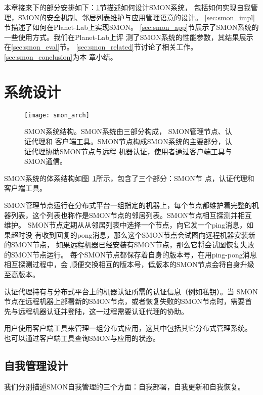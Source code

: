 本章接来下的部分安排如下：\ref{sec:smon_design}节描述如何设计SMON系统，
包括如何实现自我管理，SMON的安全机制、邻居列表维护与应用管理语意的设计。
\ref{sec:smon_impl}节描述了如何在Planet-Lab上实现SMON。
\ref{sec:smon_app}节展示了SMON系统的一些使用方式。我们在Planet-Lab上评
测了SMON系统的性能参数，其结果展示在\ref{sec:smon_eval}节。
\ref{sec:smon_related}节讨论了相关工作。\ref{sec:smon_conclusion}为本
章小结。


\section{系统设计}
\label{sec:smon_design}

\begin{figure}
  \centering
  \begin{minipage}{0.8\linewidth}
    \centering
    \texttt{[image: smon\_arch]}
    \caption[SMON系统结构]{SMON系统结构。SMON系统由三部分构成，
    SMON管理节点、认证代理和
    客户端工具。SMON节点构成SMON系统的主要部分，认证代理协助SMON节点与远程
    机器认证，使用者通过客户端工具与SMON通信。}
    \label{fig:smon_arch}
  \end{minipage}
\end{figure}

SMON系统的体系结构如图~\ref{fig:smon_arch}所示，包含了三个部分：SMON节
点，认证代理和客户端工具。

SMON管理节点运行在分布式平台一组指定的机器上，每个节点都维护着完整的机
器列表，这个列表也称作是SMON节点的邻居列表。SMON节点相互探测并相互维护。
SMON节点定期从从邻居列表中选择一个节点，向它发一个ping消息，如果超时没
有收到回复的pong消息，那么这个SMON节点会试图向远程机器安装新的SMON节点，
如果远程机器已经安装有SMON节点，那么它将会试图恢复失败的SMON节点运行。
每个SMON节点都保存着自身的版本号，在用ping-pong消息相互探测过程中，会
顺便交换相互的版本号，低版本的SMON节点会将自身升级至高版本。

认证代理持有与分布式平台上的机器认证所需的认证信息（例如私钥）。当
SMON节点在远程机器上部署新的SMON节点，或者恢复失败的SMON节点时，需要首
先与远程机器认证并登陆，这一过程需要认证代理的协助。

用户使用客户端工具来管理一组分布式应用，这其中包括其它分布式管理系统。
也可以通过客户端工具查询SMON与应用的状态。

\subsection{自我管理设计}

我们分别描述SMON自我管理的三个方面：自我部署，自我更新和自我恢复。

